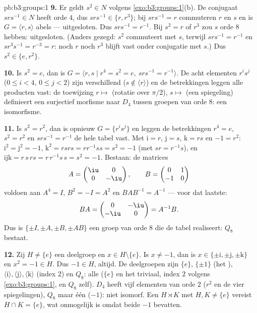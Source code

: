 \begin{solution}{pb:b3:groups:1}
\textbf{9.} Er geldt $s^2 \in N$ volgens
\cref{exo:b3:groups:1}(b). De conjugaat $srs^{-1} \in N$ heeft orde
$4$, dus $srs^{-1} \in \{r, r^3\}$; bij $srs^{-1} = r$ commuteren
$r$ en $s$ en is $G = \langle r, s\rangle$ abels --- uitgesloten.
Dus $srs^{-1} = r^{-1}$. Bij $s^2 = r$ of $r^3$ zou $s$ orde $8$
hebben: uitgesloten. (Anders gezegd: $s^2$ commuteert met $s$,
terwijl $s r s^{-1} = r^{-1}$ en $s r^3 s^{-1} = r^{-3} = r$: noch
$r$ noch $r^3$ blijft vast onder conjugatie met $s$.) Dus $s^2 \in
\{e, r^2\}$.

\textbf{10.} Is $s^2 = e$, dan is $G = \langle r, s \mid r^4 = s^2
= e,\ srs^{-1} = r^{-1}\rangle$. De acht elementen $r^is^j$ ($0
\leq i < 4$, $0 \leq j < 2$) zijn verschillend ($s \notin \langle
r\rangle$) en de betrekkingen leggen alle producten vast: de
toewijzing $r \mapsto$ (rotatie over $\pi/2$), $s \mapsto$ (een
spiegeling) definieert een surjectief morfisme naar $D_4$ tussen
groepen van orde $8$: een isomorfisme.

\textbf{11.} Is $s^2 = r^2$, dan is opnieuw $G = \{r^i s^j\}$ en
leggen de betrekkingen $r^4 = e$, $s^2 = r^2$ en $srs^{-1} =
r^{-1}$ de hele tabel vast. Met $\mathrm i = r$, $\mathrm j = s$,
$\mathrm k = rs$ en $-1 = r^2$: $\mathrm i^2 = \mathrm j^2 = -1$,
$\mathrm k^2 = rsrs = r r^{-1} s s = s^2 = -1$ (met $sr =
r^{-1}s$), en $\mathrm i \mathrm j \mathrm k = r\,s\,rs = r\,r^{-1}
s\,s = s^2 = -1$. Bestaan: de matrices
\[
A = \begin{pmatrix} \iu & 0\\ 0 & -\iu \end{pmatrix},
\qquad
B = \begin{pmatrix} 0 & 1\\ -1 & 0 \end{pmatrix}
\]
voldoen aan $A^4 = I$, $B^2 = -I = A^2$ en $BAB^{-1} = A^{-1}$ ---
voor dat laatste:
\[
BA = \begin{pmatrix} 0 & -\iu\\ -\iu & 0 \end{pmatrix} = A^{-1}B .
\]
Dus is $\{\pm I, \pm A, \pm B, \pm AB\}$ een groep van orde $8$ die
de tabel realiseert: $Q_8$ bestaat.

\textbf{12.} Zij $H \neq \{e\}$ een deelgroep en $x \in H \setminus
\{e\}$. Is $x \neq -1$, dan is $x \in \{\pm\mathrm i, \pm\mathrm j,
\pm\mathrm k\}$ en $x^2 = -1 \in H$. Dus $-1 \in H$, altijd. De
deelgroepen zijn $\{e\}$, $\{\pm 1\}$ (het ), $\langle
\mathrm i\rangle, \langle \mathrm j\rangle, \langle \mathrm
k\rangle$ (index $2$) en $Q_8$: alle  ($\{e\}$ en het
 triviaal, index $2$ volgens \cref{exo:b3:groups:1}, en
$Q_8$ zelf). $D_4$ heeft vijf elementen van orde $2$ ($r^2$ en de
vier spiegelingen), $Q_8$ maar één ($-1$): niet isomorf. Een
 $H \rtimes K$ met $H, K \neq \{e\}$ vereist $H
\cap K = \{e\}$, wat onmogelijk is omdat beide $-1$ bevatten.


\end{solution}
